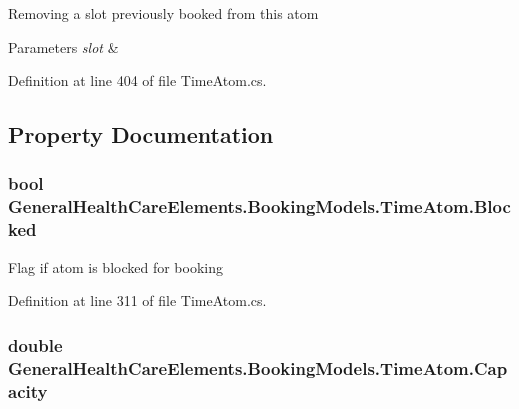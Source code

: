 Removing a slot previously booked from this atom 


\begin{DoxyParams}{Parameters}
{\em slot} & \\
\hline
\end{DoxyParams}


Definition at line 404 of file Time\+Atom.\+cs.



\subsection{Property Documentation}
\subsubsection[{\texorpdfstring{Blocked}{Blocked}}]{\setlength{\rightskip}{0pt plus 5cm}bool General\+Health\+Care\+Elements.\+Booking\+Models.\+Time\+Atom.\+Blocked\hspace{0.3cm}{\ttfamily [get]}}\hypertarget{class_general_health_care_elements_1_1_booking_models_1_1_time_atom_acf166733898dfce5f1a37539da08ebd5}{}\label{class_general_health_care_elements_1_1_booking_models_1_1_time_atom_acf166733898dfce5f1a37539da08ebd5}


Flag if atom is blocked for booking 



Definition at line 311 of file Time\+Atom.\+cs.

\subsubsection[{\texorpdfstring{Capacity}{Capacity}}]{\setlength{\rightskip}{0pt plus 5cm}double General\+Health\+Care\+Elements.\+Booking\+Models.\+Time\+Atom.\+Capacity\hspace{0.3cm}{\ttfamily [get]}}\hypertarget{class_general_health_care_elements_1_1_booking_models_1_1_time_atom_ac0b8fb67050d24d7b5d9ac044afd87ea}{}\label{class_general_health_care_elements_1_1_booking_models_1_1_time_atom_ac0b8fb67050d24d7b5d9ac044afd87ea}


